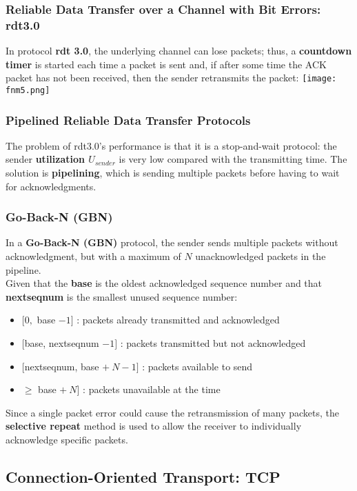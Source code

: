 \documentclass{article}
\begin{document}
\subsubsection*{Reliable Data Transfer over a Channel with Bit Errors: rdt3.0}
In protocol \textbf{rdt 3.0}, the underlying channel can lose packets; thus, a \textbf{countdown timer} is started each time a packet is sent and, if after some time the ACK packet has not been received, then the sender retransmits the packet:
\texttt{[image: fnm5.png]}
\subsubsection{Pipelined Reliable Data Transfer Protocols}
The problem of rdt3.0’s performance is that it is a stop-and-wait protocol: the sender \textbf{utilization $ U_{sender} $} is very low compared with the transmitting time.
The solution is \textbf{pipelining}, which is sending multiple packets before having to wait for acknowledgments.
\subsubsection{Go-Back-N (GBN)}
In a \textbf{Go-Back-N (GBN)} protocol, the sender sends multiple packets without acknowledgment, but with a maximum of $ N $ unacknowledged packets in the pipeline. \\
Given that the \textbf{base} is the oldest acknowledged sequence number and that \textbf{nextseqnum} is the smallest unused sequence number:
\begin{itemize}
    \item $ [0, $ base $ - 1] $ : packets already transmitted and acknowledged
    \item $ [ $base, nextseqnum $ - 1] $ : packets transmitted but not acknowledged
    \item $ [ $nextseqnum, base $ + \ N - 1] $ : packets available to send
    \item $ \geq $ base $ + \ N ] $ : packets unavailable at the time
\end{itemize}
Since a single packet error could cause the retransmission of many packets, the \textbf{selective repeat} method is used to allow the receiver to individually acknowledge specific packets.

\subsection{Connection-Oriented Transport: TCP}
\end{document}

